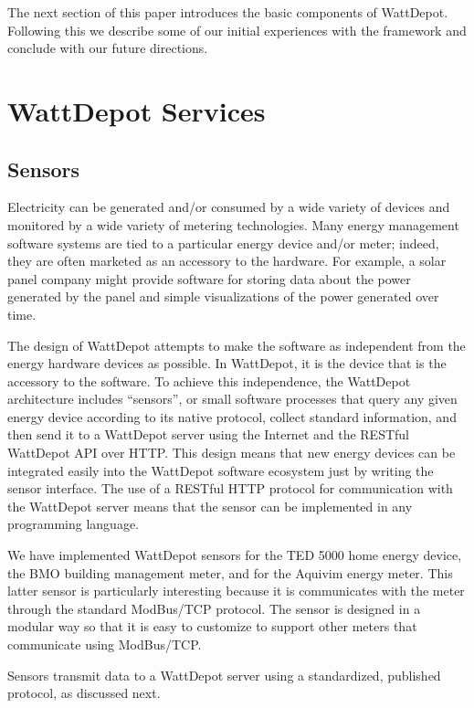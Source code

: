 \documentclass[conference,compsoc]{IEEEtran}
\begin{document}
The next section of this paper introduces the basic components of
WattDepot. Following this we describe some of our initial experiences with
the framework and conclude with our future directions. 

\section{WattDepot Services}

\subsection{Sensors}

Electricity can be generated and/or consumed by a wide variety of devices
and monitored by a wide variety of metering technologies.  Many energy
management software systems are tied to a particular energy device and/or
meter; indeed, they are often marketed as an accessory to the hardware.  For
example, a solar panel company might provide software for storing data
about the power generated by the panel and simple visualizations of the
power generated over time.

The design of WattDepot attempts to make the software as independent from
the energy hardware devices as possible.  In WattDepot, it is the device
that is the accessory to the software.  To achieve this independence, the
WattDepot architecture includes ``sensors'', or small software processes
that query any given energy device according to its native protocol,
collect standard information, and then send it to a WattDepot server using
the Internet and the RESTful WattDepot API over HTTP.  This design means
that new energy devices can be integrated easily into the WattDepot
software ecosystem just by writing the sensor interface.  The use of a
RESTful HTTP protocol for communication with the WattDepot server means
that the sensor can be implemented in any programming language.

We have implemented WattDepot sensors for the TED 5000 home energy device, 
the BMO building management meter, and for the Aquivim energy meter. This
latter sensor is particularly interesting because it is communicates with the
meter through the standard ModBus/TCP protocol.  The sensor is designed in 
a modular way so that it is easy to customize to support other meters that 
communicate using ModBus/TCP.

Sensors transmit data to a WattDepot server using a standardized, published
protocol, as discussed next.
\end{document}
